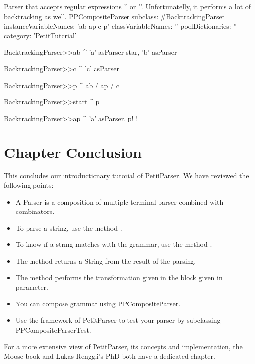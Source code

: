 \documentclass[a4paper,10pt,twoside]{book}
\begin{document}
\begin{script}{Parser that accepts regular expressions '' or ''. Unfortunatelly, it performs a lot of backtracking as well. \label{scr:pp/backtrackingParser}}
PPCompositeParser subclass: #BacktrackingParser
	instanceVariableNames: 'ab ap c p'
	classVariableNames: ''
	poolDictionaries: ''
	category: 'PetitTutorial'

BacktrackingParser>>ab
  ^ 'a' asParser star, 'b' asParser

BacktrackingParser>>c
  ^ 'c' asParser

BacktrackingParser>>p 
  ^ ab / ap / c

BacktrackingParser>>start 
  ^ p


BacktrackingParser>>ap
  ^ 'a' asParser, p! !
\end{script}



\section{Chapter Conclusion}

This concludes our introductionary tutorial of PetitParser. We have reviewed the following points:


\begin{itemize}
\item A Parser is a composition of multiple terminal parser combined with combinators.
\item To parse a string, use the method .
\item To know if a string matches with the grammar, use the method .
\item The method  returns a String from the result of the parsing.
\item The method \ct{==>} performs the transformation given in the block given in parameter.
\item You can compose grammar using PPCompositeParser.
\item Use the framework of PetitParser to test your parser by subclassing PPCompositeParserTest.
\end{itemize}


For a more 
extensive view of PetitParser, its concepts and implementation, the Moose 
book\footnotemark{} and Lukas Renggli's PhD\footnotemark{} both have a dedicated 
chapter.


\ifx\wholebook\relax\else

\label{cha:glamour}


\end{document}
